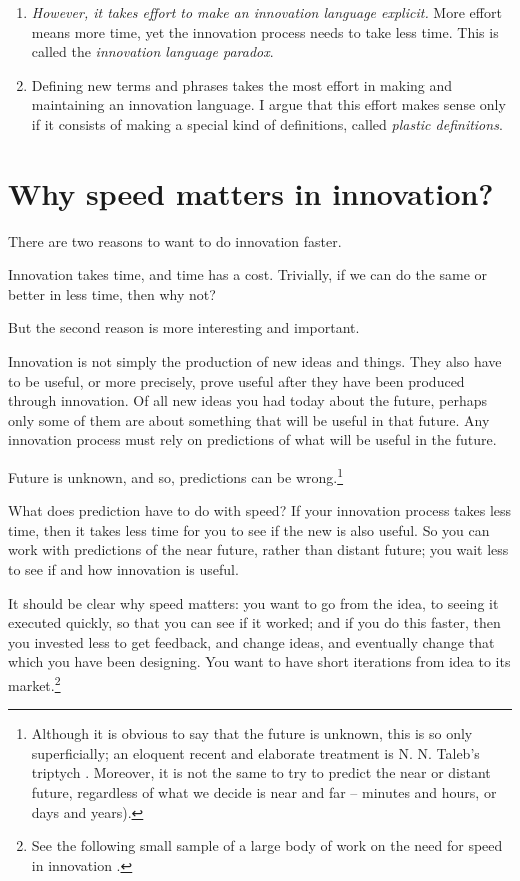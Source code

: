 \begin{enumerate}
	\item{\textit{However, it takes effort to make an innovation language explicit.} More effort means more time, yet the innovation process needs to take less time. This is called the \textit{innovation language paradox}.}
	\item{Defining new terms and phrases takes the most effort in making and maintaining an innovation language. I argue that this effort makes sense only if it consists of making a special kind of definitions, called \textit{plastic definitions}.}
\end{enumerate}

\section{Why speed matters in innovation?}
\label{c2:s4}
There are two reasons to want to do innovation faster.

Innovation takes time, and time has a cost. Trivially, if we can do the same or better in less time, then why not?

But the second reason is more interesting and important. 

Innovation is not simply the production of new ideas and things. They also have to be useful, or more precisely, prove useful after they have been produced through innovation. Of all new ideas you had today about the future, perhaps only some of them are about something that will be useful in that future. Any innovation process must rely on predictions of what will be useful in the future. 

Future is unknown, and so, predictions can be wrong.\footnote{Although it is obvious to say that the future is unknown, this is so only superficially; an eloquent recent and elaborate treatment is N. N. Taleb's triptych \cite{taleb2005fooled1,taleb2007black1,taleb2012antifragile1}. Moreover, it is not the same to try to predict the near or distant future, regardless of what we decide is near and far -- minutes and hours, or days and years).}

What does prediction have to do with speed? If your innovation process takes less time, then it takes less time for you to see if the new is also useful. So you can work with predictions of the near future, rather than distant future; you wait less to see if and how innovation is useful.

It should be clear why speed matters: you want to go from the idea, to seeing it executed quickly, so that you can see if it worked; and if you do this faster, then you invested less to get feedback, and change ideas, and eventually change that which you have been designing. You want to have short iterations from idea to its market.\footnote{See the following small sample of a large body of work on the need for speed in innovation \cite{teece1992,teece1997,von2005democratizing,christensen2013innovator,
ries2011leanstartup,christensen2016}.}

